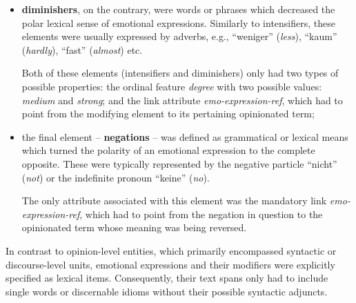 \begin{itemize}
\item
  \textbf{diminishers}, on the contrary, were words or phrases which
  decreased the polar lexical sense of emotional expressions.
  Similarly to intensifiers, these elements were usually expressed by
  adverbs, e.g., ``weniger'' (\emph{less}), ``kaum'' (\emph{hardly}),
  ``fast'' (\emph{almost}) etc.

  Both of these elements (intensifiers and diminishers) only had two
  types of possible properties: the ordinal feature \emph{degree} with
  two possible values: \emph{medium} and \emph{strong}; and the link
  attribute \emph{emo-expression-ref}, which had to point from the
  modifying element to its pertaining opinionated term;

\item
  the final element -- \textbf{negations} -- was defined as
  grammatical or lexical means which turned the polarity of an
  emotional expression to the complete opposite.  These were typically
  represented by the negative particle ``nicht'' (\emph{not}) or the
  indefinite pronoun ``keine'' (\emph{no}).

  The only attribute associated with this element was the mandatory
  link \emph{emo-expression-ref}, which had to point from the negation
  in question to the opinionated term whose meaning was being
  reversed.
\end{itemize}

In contrast to opinion-level entities, which primarily encompassed
syntactic or discourse-level units, emotional expressions and their
modifiers were explicitly specified as lexical items.  Consequently,
their text spans only had to include single words or discernable
idioms without their possible syntactic adjuncts.

